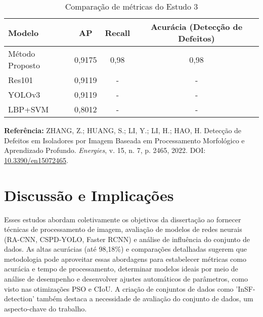 \begin{table}[h]
    \centering
    \caption{Comparação de métricas do Estudo 3}
    \begin{tabular}{lccc}
        \hline
        \textbf{Modelo} & \textbf{AP} & \textbf{Recall} & \textbf{Acurácia (Detecção de Defeitos)} \\
        \hline
        Método Proposto & 0,9175 & 0,98 & 0,98 \\
        Res101 & 0,9119 & - & - \\
        YOLOv3 & 0,9119 & - & - \\
        LBP+SVM & 0,8012 & - & - \\
        \hline
    \end{tabular}
\end{table}


\textbf{Referência:} ZHANG, Z.; HUANG, S.; LI, Y.; LI, H.; HAO, H. Detecção de Defeitos em Isoladores por Imagem Baseada em Processamento Morfológico e Aprendizado Profundo. \textit{Energies}, v. 15, n. 7, p. 2465, 2022. DOI: \href{https://doi.org/10.3390/en15072465}{10.3390/en15072465}.

\section{Discussão e Implicações}
Esses estudos abordam coletivamente os objetivos da dissertação ao fornecer técnicas de processamento de imagem, avaliação de modelos de redes neurais (RA-CNN, CSPD-YOLO, Faster RCNN) e análise de influência do conjunto de dados. As altas acurácias (até 98,18\%) e comparações detalhadas sugerem que metodologia pode aproveitar essas abordagens para estabelecer métricas como acurácia e tempo de processamento, determinar modelos ideais por meio de análise de desempenho e desenvolver ajustes automáticos de parâmetros, como visto nas otimizações PSO e CIoU. A criação de conjuntos de dados como 'InSF-detection' também destaca a necessidade de avaliação do conjunto de dados, um aspecto-chave do trabalho.


